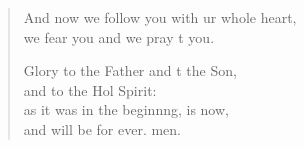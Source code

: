 \begin{verse}
\begin{patverse}
And now we follow you with ur whole heart,\Med\\
we fear you and we pray t you.

Glory to the Father and t the Son,\Med\\
    and to the Hol Spirit:\\
as it was in the beginn\pointup{\i}ng, is now,\Med\\
    and will be for ever. men.
  \end{patverse}
\end{verse}
